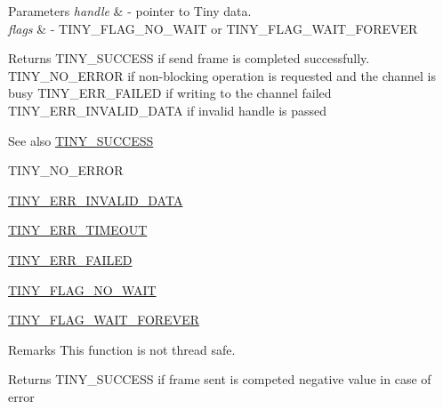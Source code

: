 \begin{DoxyParams}{Parameters}
{\em handle} & -\/ pointer to Tiny data. \\
\hline
{\em flags} & -\/ T\+I\+N\+Y\+\_\+\+F\+L\+A\+G\+\_\+\+N\+O\+\_\+\+W\+A\+IT or T\+I\+N\+Y\+\_\+\+F\+L\+A\+G\+\_\+\+W\+A\+I\+T\+\_\+\+F\+O\+R\+E\+V\+ER \\
\hline
\end{DoxyParams}
\begin{DoxyReturn}{Returns}
T\+I\+N\+Y\+\_\+\+S\+U\+C\+C\+E\+SS if send frame is completed successfully. T\+I\+N\+Y\+\_\+\+N\+O\+\_\+\+E\+R\+R\+OR if non-\/blocking operation is requested and the channel is busy T\+I\+N\+Y\+\_\+\+E\+R\+R\+\_\+\+F\+A\+I\+L\+ED if writing to the channel failed T\+I\+N\+Y\+\_\+\+E\+R\+R\+\_\+\+I\+N\+V\+A\+L\+I\+D\+\_\+\+D\+A\+TA if invalid handle is passed
\end{DoxyReturn}
\begin{DoxySeeAlso}{See also}
\hyperlink{group__ERROR__FLAGS_ga16cd043c890ed1fa381b3a20f75a626c}{T\+I\+N\+Y\+\_\+\+S\+U\+C\+C\+E\+SS} 

T\+I\+N\+Y\+\_\+\+N\+O\+\_\+\+E\+R\+R\+OR 

\hyperlink{group__ERROR__FLAGS_ga541a9e67a84e39595ad647d641c4df2e}{T\+I\+N\+Y\+\_\+\+E\+R\+R\+\_\+\+I\+N\+V\+A\+L\+I\+D\+\_\+\+D\+A\+TA} 

\hyperlink{group__ERROR__FLAGS_gac9ba8076a1eb8613e8d1f07629ff0cd1}{T\+I\+N\+Y\+\_\+\+E\+R\+R\+\_\+\+T\+I\+M\+E\+O\+UT} 

\hyperlink{group__ERROR__FLAGS_ga84e6ca143550038e1a71cf36078d1926}{T\+I\+N\+Y\+\_\+\+E\+R\+R\+\_\+\+F\+A\+I\+L\+ED} 

\hyperlink{group__FLAGS__GROUP_gadadd60eb21d7949e6d097ad36aab9b2e}{T\+I\+N\+Y\+\_\+\+F\+L\+A\+G\+\_\+\+N\+O\+\_\+\+W\+A\+IT} 

\hyperlink{group__FLAGS__GROUP_ga3a34267804581c5709d03f52d232b307}{T\+I\+N\+Y\+\_\+\+F\+L\+A\+G\+\_\+\+W\+A\+I\+T\+\_\+\+F\+O\+R\+E\+V\+ER} 
\end{DoxySeeAlso}
\begin{DoxyRemark}{Remarks}
This function is not thread safe.
\end{DoxyRemark}
Returns T\+I\+N\+Y\+\_\+\+S\+U\+C\+C\+E\+SS if frame sent is competed negative value in case of error \mbox{\label{group__ADVANCED__API_ga159189fa29f3eaa79a76a3fa87b31084}} 
